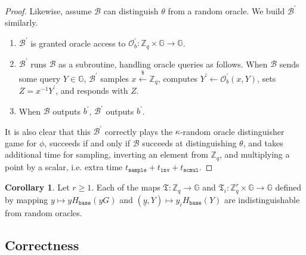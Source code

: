 \documentclass[11pt]{article}
\theoremstyle{definition}
\newtheorem{cor}[cor]{Corollary}
\newcommand{\G}{\mathbb{G}}
\newcommand{\Zq}{\mathbb{Z}_q}
\newcommand{\sample}{\overset{\$}{\leftarrow}}
\begin{document}
\begin{proof}
Likewise, assume $\mathcal{B}$ can distinguish $\theta$ from a random oracle. We build $\mathcal{B}^\prime$ similarly.
\begin{enumerate}
\item $\mathcal{B}^\prime$ is granted oracle access to $\mathcal{O}^\prime_b:\Zq \times \G \to \G$.
\item $\mathcal{B}^\prime$ runs $\mathcal{B}$ as a subroutine, handling oracle queries as follows. When $\mathcal{B}$ sends some query $Y \in \G$, $\mathcal{B}^\prime$ samples $x \sample \Zq$, computes $Y^\prime \leftarrow \mathcal{O}^\prime_b(x, Y)$, sets $Z = x^{-1}Y^\prime$, and responds with $Z$.
\item When $\mathcal{B}$ outputs $b^\prime$, $\mathcal{B}^\prime$ outputs $b^\prime$.
\end{enumerate}
It is also clear that this $\mathcal{B}^\prime$ correctly plays the $\kappa$-random oracle distinguisher game for $\phi$, succeeds if and only if $\mathcal{B}$ succeeds at distinguishing $\theta$, and takes additional time for sampling, inverting an element from $\Zq$, and multiplying a point by a scalar, i.e. extra time $t_{\texttt{sample}} + t_{\texttt{inv}} + t_{\texttt{scmul}}$.
\end{proof}


\begin{cor}\label{cor:key_images_are_random_oracles}
Let $r \geq 1$. Each of the maps $\mathfrak{T}:\Zq \to \G$ and $\mathfrak{T}_i:\Zq^r \times\G\to\G$ defined by mapping $y \mapsto yH_{\texttt{base}}(yG)$ and $(\underline{y}, Y) \mapsto y_i H_{\texttt{base}}(Y)$ are indistinguishable from random oracles.
\end{cor}

\subsection{Correctness}
\end{document}
